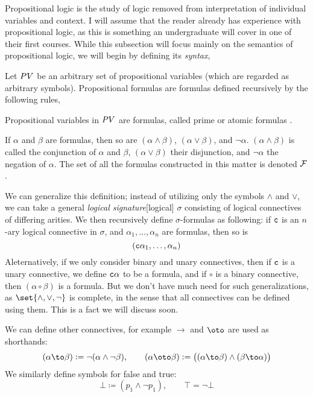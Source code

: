 Propositional logic is the study of logic removed from interpretation of individual variables and context.
I will assume that the reader already has experience with propositional logic, as this is something an undergraduate will cover in one of their first courses.
While this subsection will focus mainly on the semantics of propositional logic, we will begin by defining its {\it syntax},

\def\PV{{\sl PV}}
\def\mF{{\cal F}}
\bdefn

    Let $\PV$ be an arbitrary set of {\emphcolor propositional variables} (which are regarded as arbitrary symbols).
    {\emphcolor Propositional formulas} are formulas defined recursively by the following rules,
    \benum
        \item Propositional variables in $\PV$ are formulas, called {\emphcolor prime} or {\emphcolor atomic} formulas%
        .
        \item If $\alpha$ and $\beta$ are formulas, then so are $(\alpha\land\beta)$, $(\alpha\lor\beta)$, and $\neg\alpha$.
        $(\alpha\land\beta)$ is called the {\emphcolor conjunction} of $\alpha$ and $\beta$, $(\alpha\lor\beta)$ their {\emphcolor disjunction}, and
        $\neg\alpha$ the {\emphcolor negation} of $\alpha$.
    \eenum
    The set of all the formulas constructed in this matter is denoted $\mF$.

\edefn

We can generalize this definition; instead of utilizing only the symbols $\land$ and $\lor$, we can take a general {\it logical signature}[logical] $\sigma$ consisting of logical
connectives of differing arities.
We then recursively define $\sigma$-formulas as following: if ${\tt c}$ is an $n$-ary logical connective in $\sigma$, and $\alpha_1,\dots,\alpha_n$ are formulas, then so is
$$ ({\tt c}\alpha_1,\dots,\alpha_n) $$
Aleternatively, if we only consider binary and unary connectives, then if ${\tt c}$ is a unary connective, we define ${\tt c}\alpha$ to be a formula, and if $\circ$ is a binary connective, then
$(\alpha\circ\beta)$ is a formula.
But we don't have much need for such generalizations, as $\set{\land, \lor, \neg}$ is complete, in the sense that all connectives can be defined using them.
This is a fact we will discuss soon.

We can define other connectives, for example $\to$ and $\oto$ are used as shorthands:
$$ (\alpha\to\beta) \coloneqq \neg(\alpha\land\neg\beta),\qquad (\alpha\oto\beta) \coloneqq \bigl((\alpha\to\beta)\land(\beta\to\alpha)\bigr) $$
We similarly define symbols for false and true:
$$ \bot \coloneqq (p_1\land\neg p_1),\qquad \top = \neg\bot $$

